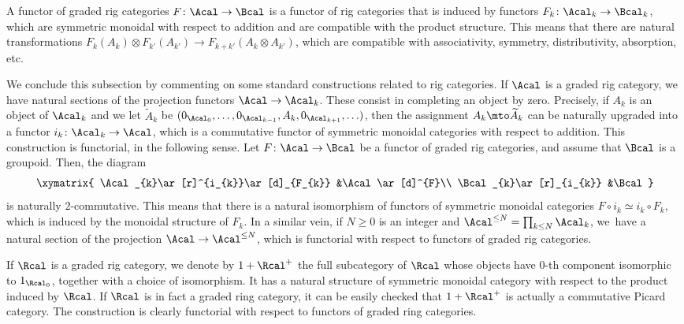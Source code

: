 A functor of graded rig categories $F\colon\Acal\to\Bcal$ is a functor of rig categories that is induced by functors $F_{k}\colon \Acal_{k}\to\Bcal_{k}$, which are symmetric monoidal with respect to addition and are compatible with the product structure. This means that there are natural transformations $F_{k}(A_{k})\otimes F_{k'}(A_{k'})\to F_{k+k'}(A_{k}\otimes A_{k'})$, which are compatible with associativity, symmetry, distributivity, absorption, etc.

We conclude this subsection by commenting on some standard constructions related to rig categories. If $\Acal$ is a graded rig category, we have natural sections of the projection functors $\Acal\to\Acal_{k}$. These consist in completing an object by zero. Precisely, if $A_{k}$ is an object of $\Acal_{k}$ and we let $\widetilde{A}_{k}$ be $(0_{\Acal_{0}},\ldots, 0_{\Acal_{k-1}},A_{k},0_{\Acal_{k+1}},\ldots)$, then the assignment $A_{k}\mto\widetilde{A}_{k}$ can be naturally upgraded into a functor $i_{k}\colon\Acal_{k}\to\Acal$, which is a commutative functor of symmetric monoidal categories with respect to addition. This construction is functorial, in the following sense. Let $F\colon\Acal\to\Bcal$ be a functor of graded rig categories, and assume that $\Bcal$ is a groupoid. Then, the diagram
\begin{displaymath}
\xymatrix{
\Acal_{k}\ar[r]^{i_{k}}\ar[d]_{F_{k}} &\Acal\ar[d]^{F}\\
\Bcal_{k}\ar[r]_{i_{k}} &\Bcal
}
\end{displaymath}
is naturally $2$-commutative. This means that there is a natural isomorphism of functors of symmetric monoidal categories $F\circ i_{k}\simeq i_{k}\circ F_{k}$, which is induced by the monoidal structure of $F_{k}$. In a similar vein, if $N\geq 0$ is an integer and $\Acal^{\leq N}=\prod_{k\leq N}\Acal_{k}$, we~have a natural section of the projection $\Acal\to\Acal^{\leq N}$, which is functorial with respect to functors of graded rig categories.

If $\Rcal$ is a graded rig category, we denote by $1+\Rcal^{+}$ the full subcategory of $\Rcal$ whose objects have $0$-th component isomorphic to $1_{\Rcal_{0}}$, together with a choice of isomorphism. It has a natural structure of symmetric monoidal category with respect to the product induced by $\Rcal$. If $\Rcal$ is in fact a graded ring category, it can be easily checked that $1+\Rcal^{+}$ is actually a commutative Picard category. The construction is clearly functorial with respect to functors of graded ring categories.

